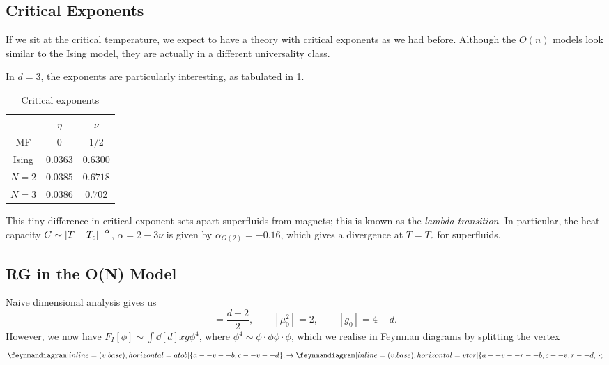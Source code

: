 \subsection{Critical Exponents}%
\label{sub:critical_exponent}

If we sit at the critical temperature, we expect to have a theory with critical exponents as we had before.
Although the $O(n)$ models look similar to the Ising model, they are actually in a different universality class.

In $d = 3$, the exponents are particularly interesting, as tabulated in \ref{tab:14-1}.
\begin{table}[htpb]
  \centering
  \begin{tabular}{c | c c}
     & $\eta$ & $\nu$ \\
     \hline
     MF & $0$ & $1/2$ \\
     Ising & $0.0363$ & $0.6300$ \\
     $N = 2$ & $0.0385$ & $0.6718$ \\
     $N = 3$ & $0.0386$ & $0.702$ \\
  \end{tabular}
  \caption{Critical exponents}
  \label{tab:14-1}
\end{table}
This tiny difference in critical exponent sets apart superfluids from magnets; this is known as the \emph{lambda transition}. In particular, the heat capacity $C \sim \abs{T - T_c}^{-\alpha}$, $\alpha = 2 - 3 \nu$ is given by $\alpha_{O(2)} = -0.16$, which gives a divergence at $T = T_c$ for superfluids.

\subsection{RG in the O(N) Model}%
\label{sub:rg_in_the_o_n_model}

Naive dimensional analysis gives us
\begin{equation}
  [\phi] = \frac{d-2}{2}, \qquad [\mu_0^2] = 2, \qquad [g_0] = 4 - d.
\end{equation}
However, we now have $F_I[\phi] \sim \int \dd[d]{x} g \phi^4$, where $\phi^4 \sim \phi \cdot \phi \phi \cdot \phi$, which we realise in Feynman diagrams by splitting the vertex
\begin{equation}
  \feynmandiagram[inline=(v.base), horizontal=a to b] {
    a -- v -- b,
    c -- v -- d
  };
  \to
  \feynmandiagram[inline=(v.base), horizontal=v to r] {
    a -- v -- r -- b,
    c -- v,
    r -- d,
  };
\end{equation}


